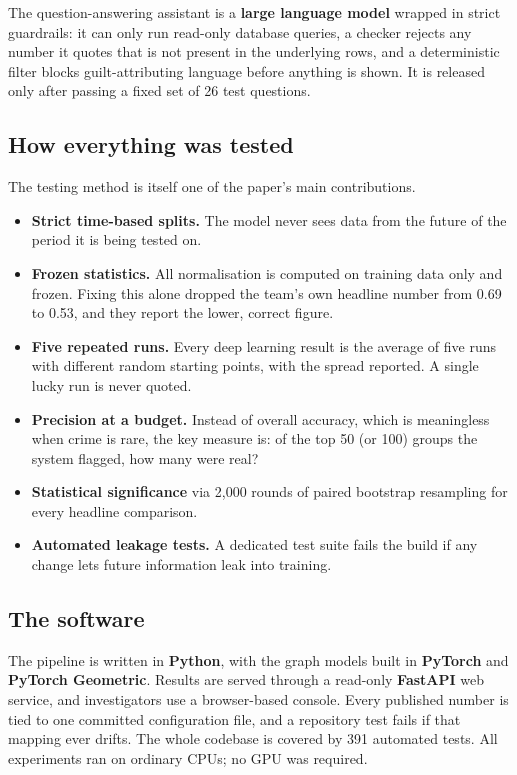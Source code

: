 \documentclass[11pt,a4paper]{article}
\begin{document}
The question-answering assistant is a \textbf{large language model} wrapped in
strict guardrails: it can only run read-only database queries, a checker rejects
any number it quotes that is not present in the underlying rows, and a
deterministic filter blocks guilt-attributing language before anything is
shown. It is released only after passing a fixed set of 26 test questions.

\subsection{How everything was tested}

The testing method is itself one of the paper's main contributions.

\begin{itemize}
\item \textbf{Strict time-based splits.} The model never sees data from the
      future of the period it is being tested on.
\item \textbf{Frozen statistics.} All normalisation is computed on training
      data only and frozen. Fixing this alone dropped the team's own headline
      number from 0.69 to 0.53, and they report the lower, correct figure.
\item \textbf{Five repeated runs.} Every deep learning result is the average of
      five runs with different random starting points, with the spread
      reported. A single lucky run is never quoted.
\item \textbf{Precision at a budget.} Instead of overall accuracy, which is
      meaningless when crime is rare, the key measure is: of the top 50 (or
      100) groups the system flagged, how many were real?
\item \textbf{Statistical significance} via 2,000 rounds of paired
      bootstrap resampling for every headline comparison.
\item \textbf{Automated leakage tests.} A dedicated test suite fails the build
      if any change lets future information leak into training.
\end{itemize}

\subsection{The software}

The pipeline is written in \textbf{Python}, with the graph models built in
\textbf{PyTorch} and \textbf{PyTorch Geometric}. Results are served through a
read-only \textbf{FastAPI} web service, and investigators use a browser-based
console. Every published number is tied to one committed configuration file,
and a repository test fails if that mapping ever drifts. The whole codebase is
covered by 391 automated tests. All experiments ran on ordinary CPUs; no GPU
was required.
\end{document}
